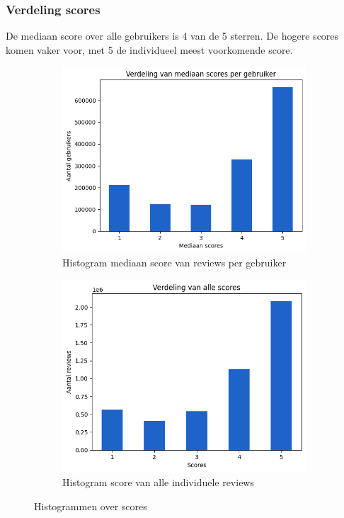 \subsubsection{Verdeling scores}
De mediaan score over alle gebruikers is 4 van de 5 sterren. De hogere scores komen vaker voor, met 5 de individueel meest voorkomende score.
\begin{figure}[H]
    \begin{subfigure}{.5\textwidth}
        \centering
        \includegraphics[width=1\linewidth]{fig/chapt3/verdeling_mediaan_scores_per_gebruiker.png}
        \caption{Histogram mediaan score van reviews per gebruiker}
        \label{fig:chapt3_verdeling_mediaan_scores_per_gebruiker}
    \end{subfigure}
    \begin{subfigure}{.5\textwidth}
        \centering
        \includegraphics[width=1\linewidth]{fig/chapt3/verdeling_alle_scores.png}
        \caption{Histogram score van alle individuele reviews}
        \label{fig:chapt3_verdeling_alle_scores}
    \end{subfigure}
    \caption{Histogrammen over scores}
\end{figure}
